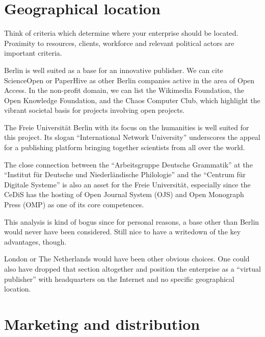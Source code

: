 \documentclass[output=guidelines,nonflat,smallfont,
draftmode
]{langsci/langscibook}
\newcommand{\background}[1]{ 
  \vspace{5mm}
  \renewcommand{\tblslinecolour}{lsDarkBlue}
  \tblssy[red]{explore2}{Background}{\vspace*{-5mm}#1}
}
\newcommand{\langscisolution}[1]{
  \renewcommand{\tblslinecolour}{lsLightBlue}
  \tblssy{langsci}{LangSci solution}{\vspace*{-5mm}#1}
}
\newcommand{\evaluation}[1]{
  \renewcommand{\tblslinecolour}{lsLightOrange}
  \tblssy{receipt}{Evaluation}{\vspace*{-5mm}#1}
}
\newcommand{\othersolutions}[1]{
  \renewcommand{\tblslinecolour}{lsDarkGreenOne}
  \tblssy{more}{Other solutions}{\vspace*{-5mm}#1}
}
\renewcommand{\tblssy}[4][black!12]{%
  \renewcommand{\langscisymbol}{#2}\renewcommand{\tblsboxcolor}{#1}
  \begin{mdframed}[style=yellowexercise,frametitle={#3}]
    #4
  \end{mdframed}
}
\begin{document}
\section{Geographical location}

\background{Think of criteria which determine where your enterprise should be located. Proximity to resources, clients, workforce and relevant political actors are important criteria.}
\langscisolution{
Berlin is well suited as a base for an innovative publisher. We can cite ScienceOpen or PaperHive as other Berlin companies active in the area of Open Access. In the non-profit domain, we can list the Wikimedia Foundation, the Open Knowledge Foundation, and the Chaos Computer Club, which highlight the vibrant societal basis for projects involving open projects. 

The Freie Universität Berlin with its focus on the humanities is well suited for this project. Its slogan ``International Network University'' underscores the appeal for a publishing platform bringing together scientists from all over the world. 

The close connection between the ``Arbeitsgruppe Deutsche Grammatik'' at the ``Institut für Deutsche und Niederländische Philologie'' and the ``Centrum für Digitale Systeme'' is also an asset for the Freie Universität, especially since the CeDiS has the hosting of Open Journal System (OJS) and Open Monograph Press (OMP) as one of its core competences.
}
\evaluation{This analysis is kind of bogus since for personal reasons, a base other than Berlin would never have been considered. Still nice to have a writedown of the key advantages, though.}
\othersolutions{London or The Netherlands would have been other obvious choices. One could also have dropped that section altogether and position the enterprise as a ``virtual publisher'' with headquarters on the Internet and no specific geographical location.}
 

\section{Marketing and distribution}
\end{document}
